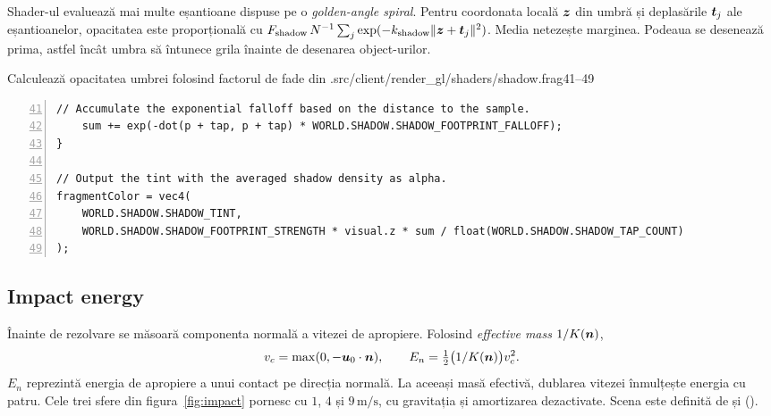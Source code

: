 \documentclass[11pt,a4paper]{article}
\begin{document}
Shader-ul evaluează mai multe eșantioane dispuse pe o
\emph{golden-angle spiral}. Pentru coordonata locală \(\boldsymbol{z}\)
din umbră și deplasările \(\boldsymbol{t}_j\) ale eșantioanelor, opacitatea
este proporțională cu
\(F_{\mathrm{shadow}}\,N^{-1}\sum_j
 \exp(-k_{\mathrm{shadow}}\|\boldsymbol{z}+\boldsymbol{t}_j\|^2)\).
Media netezește marginea. Podeaua se desenează prima, astfel
încât umbra să întunece grila înainte de desenarea object-urilor.
\begin{codefragment}{Calculează opacitatea umbrei folosind factorul de fade din .}{src/client/render_gl/shaders/shadow.frag}{41--49}
\begin{lstlisting}[language=ReportGLSL,numbers=left,firstnumber=41]
    // Accumulate the exponential falloff based on the distance to the sample.
    sum += exp(-dot(p + tap, p + tap) * WORLD.SHADOW.SHADOW_FOOTPRINT_FALLOFF);
}

// Output the tint with the averaged shadow density as alpha.
fragmentColor = vec4(
    WORLD.SHADOW.SHADOW_TINT,
    WORLD.SHADOW.SHADOW_FOOTPRINT_STRENGTH * visual.z * sum / float(WORLD.SHADOW.SHADOW_TAP_COUNT)
);
\end{lstlisting}
\end{codefragment}

\subsection{Impact energy}

Înainte de rezolvare se măsoară componenta normală a vitezei
de apropiere. Folosind \emph{effective mass} \(1/K(\boldsymbol{n})\),
\begin{equation}
 v_c=\max(0,-\boldsymbol{u}_0\cdot\boldsymbol{n}),\qquad
 E_n=\tfrac12\bigl(1/K(\boldsymbol{n})\bigr)v_c^2 .
\end{equation}
\(E_n\) reprezintă energia de apropiere a unui contact pe
direcția normală. La aceeași masă efectivă, dublarea vitezei
înmulțește energia cu patru. Cele trei sfere din
figura~\ref{fig:impact} pornesc cu \(1\), \(4\) și \(9\,\mathrm{m/s}\),
cu gravitația și amortizarea dezactivate. Scena este definită
de  și 
().
\end{document}
